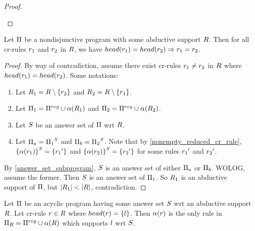 \documentclass{paper}
\begin{document}
\begin{flushleft}
\begin{proof}
\begin{enumerate}
\end{enumerate}

\end{proof}

\begin{lemma}
\label{diff_cr_literals}

Let $\Pi$ be a nondisjunctive \cp{} program with some
abductive support $R$.
Then for all cr-rules ${r}_{1}$ and ${r}_{2}$ in $R$,
we have
$head({r}_{1}) = head({r}_{2}) \Rightarrow {r}_{1} = {r}_{2}$.

\end{lemma}

\begin{proof}

By way of contradiction, assume there exist cr-rules
${r}_{1}\ne {r}_{2}$ in $R$ where
$head({r}_{1}) = head({r}_{2})$.
Some notations:
\begin{enumerate}
\item
Let ${R}_{1} = R \setminus \{{r}_{2}\}$ and
${R}_{2} = R \setminus \{{r}_{1}\}$.
\item
Let ${\Pi}_{1} = \Pi^{reg} \cup \alpha({R}_{1})$ and
${\Pi}_{2} = \Pi^{reg} \cup \alpha({R}_{2})$.
\item
Let $S$ be an answer set of $\Pi$ wrt $R$.
\item
Let ${\Pi}_{a} = {{\Pi}_{1}}^{S}$ and
${\Pi}_{b} = {{\Pi}_{2}}^{S}$.
Note that by \ref{nonempty_reduced_cr_rule},
${\{\alpha({r}_{1})\}}^{S} = \{{{r}_{1}}'\}$ and
${\{\alpha({r}_{2})\}}^{S} = \{{{r}_{2}}'\}$ for
some \dnf{} rules ${{r}_{1}}'$ and ${{r}_{2}}'$.
\end{enumerate}

By \ref{answer_set_subprogram}, $S$ is an answer set of
either ${\Pi}_{a}$ or ${\Pi}_{b}$.
WOLOG, assume the former.
Then $S$ is an answer set of ${\Pi}_{1}$.
So ${R}_{1}$ is an abductive support of $\Pi$,
but $|{R}_{1}| < |R|$, contradiction.

\end{proof}

\begin{lemma}
\label{sole_supporting_rule}

Let $\Pi$ be an acyclic \cp{} program having some answer set
$S$ wrt an abductive support $R$.
Let cr-rule $r \in R$ where $head(r) = \{l\}$.
Then $\alpha(r)$ is the only rule in $\Pi_{R} = \Pi^{reg} \cup \alpha(R)$ which
supports $l$ wrt $S$.

\end{lemma}


\end{flushleft}
\end{document}
